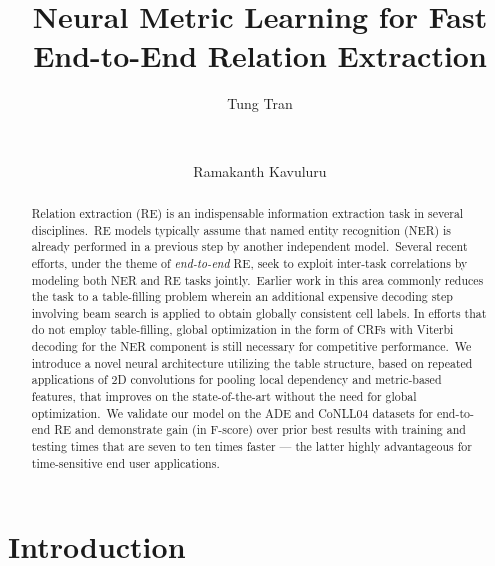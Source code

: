 \documentclass{clv3}
\begin{document}
\title{Neural Metric Learning for Fast End-to-End Relation Extraction}

\author{Tung Tran}

\author{\,}

\author{Ramakanth Kavuluru}

\maketitle

\begin{abstract}
  Relation extraction (RE) is an indispensable information extraction task in several disciplines.~RE models typically assume that named entity recognition (NER) is already performed in a previous step by another independent model.~Several recent efforts, under the theme of \emph{end-to-end} RE, seek to exploit inter-task correlations by modeling both NER and RE tasks jointly.~Earlier work in this area commonly reduces the task to a table-filling problem wherein an additional expensive decoding step involving beam search is applied to obtain globally consistent cell labels. In efforts that do not employ table-filling, global optimization in the form of CRFs with Viterbi decoding for the NER component is still necessary for competitive performance.~We introduce a novel neural architecture utilizing the table structure, based on repeated applications of 2D convolutions for pooling local dependency and metric-based features, that improves on the state-of-the-art
  without the need for global optimization.~We validate our model on the ADE and CoNLL04 datasets for end-to-end RE and demonstrate  gain (in F-score) over prior best results with training and testing times that are seven to ten times faster --- the latter highly advantageous for time-sensitive end user applications.
\end{abstract}

\section{Introduction}
\end{document}

